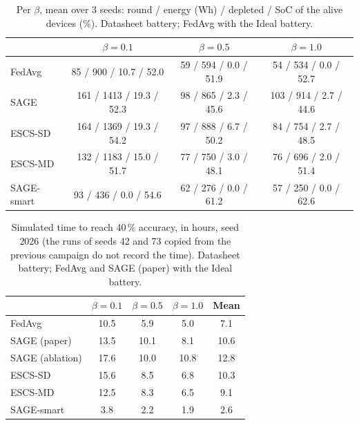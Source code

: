 \documentclass[11pt,a4paper]{article}
\begin{document}
\begin{table}[H]
  \centering
  \caption{Per $\beta$, mean over 3 seeds: round / energy (Wh) / depleted / SoC
  of the alive devices (\%). Datasheet battery; FedAvg with the Ideal battery.}
  \label{tab:thr_beta}
  \begin{tabular}{lccc}
    \toprule
    & $\beta = 0.1$ & $\beta = 0.5$ & $\beta = 1.0$ \\
    \midrule
    FedAvg      & 85 / 900 / 10.7 / 52.0   & 59 / 594 / 0.0 / 51.9  & 54 / 534 / 0.0 / 52.7 \\
    SAGE        & 161 / 1413 / 19.3 / 52.3 & 98 / 865 / 2.3 / 45.6  & 103 / 914 / 2.7 / 44.6 \\
    ESCS-SD     & 164 / 1369 / 19.3 / 54.2 & 97 / 888 / 6.7 / 50.2  & 84 / 754 / 2.7 / 48.5 \\
    ESCS-MD     & 132 / 1183 / 15.0 / 51.7 & 77 / 750 / 3.0 / 48.1  & 76 / 696 / 2.0 / 51.4 \\
    SAGE-smart  & 93 / 436 / 0.0 / 54.6    & 62 / 276 / 0.0 / 61.2  & 57 / 250 / 0.0 / 62.6 \\
    \bottomrule
  \end{tabular}
\end{table}

\begin{table}[H]
  \centering
  \caption{Simulated time to reach 40\,\% accuracy, in hours, seed 2026 (the
  runs of seeds 42 and 73 copied from the previous campaign do not record the
  time). Datasheet battery; FedAvg and SAGE (paper) with the Ideal battery.}
  \label{tab:thr_time}
  \begin{tabular}{lcccc}
    \toprule
    & $\beta = 0.1$ & $\beta = 0.5$ & $\beta = 1.0$ & Mean \\
    \midrule
    FedAvg             & 10.5 & 5.9  & 5.0  & 7.1 \\
    SAGE (paper)       & 13.5 & 10.1 & 8.1  & 10.6 \\
    SAGE (ablation)    & 17.6 & 10.0 & 10.8 & 12.8 \\
    ESCS-SD            & 15.6 & 8.5  & 6.8  & 10.3 \\
    ESCS-MD            & 12.5 & 8.3  & 6.5  & 9.1 \\
    SAGE-smart         & 3.8  & 2.2  & 1.9  & 2.6 \\
    \bottomrule
  \end{tabular}
\end{table}
\end{document}
